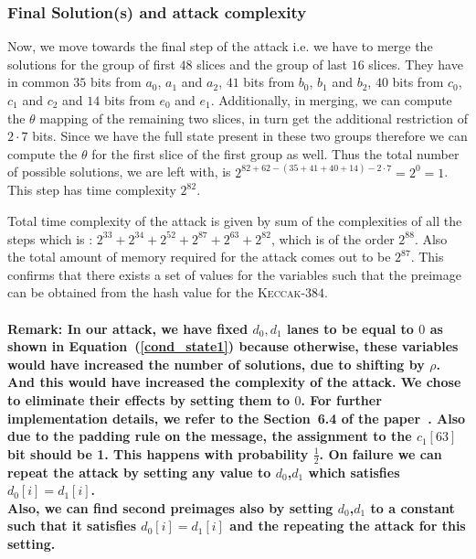 \documentclass[runningheads]{llncs}
\newcommand{\Keccak}{\mbox{\textsc{Keccak}}}
\begin{document}
\subsubsection{Final Solution(s) and attack complexity}
Now, we move towards the final step of the attack i.e. we have to merge the solutions for the group of first $48$ slices and the group of last $16$ slices. They have in common $35$ bits from $a_0$, $a_1$ and  $a_2$, $41$ bits from $b_0$, $b_1$ and $b_2$, $40$ bits from $c_0$, $c_1$ and $c_2$ and $14$ bits from $e_0$ and $e_1$. Additionally, in merging, we can compute the $\theta$ mapping of the remaining two slices, in turn get the additional restriction of $2\cdot 7$ bits. Since we have the full state present in these two groups therefore we can compute the $\theta$ for the first slice of the first group as well. Thus the total number of possible solutions, we are left with, is $2^{82 + 62 - (35 + 41 + 40 + 14) - 2 \cdot 7} = 2^{0} = 1$. This step has time complexity $ 2^{82}$.

Total time complexity of the attack is given by sum of the complexities of all the steps which is : $2^{33} + 2^{34} + 2^{52} + 2^{87} + 2^{63} + 2^{82}$, which is of the order $2^{88}$.
Also the total amount of memory required for the attack comes out to be $2^{87}$. 
This confirms that there exists a set of values for the variables such that the preimage can be obtained from the hash value for the \Keccak-$384$.


\paragraph{\textbf{Remark:}
In our attack, we have fixed $d_0, d_1$ lanes to be equal to $0$ as shown in Equation~(\ref{cond_state1}) because otherwise, these variables would have increased the number of solutions, due to shifting by $\rho$. 
And this would have increased the complexity of the attack. We chose to eliminate their effects by setting them to $0$. For further implementation details, we refer to the Section~6.4 of the paper~\cite{naya2011practical}. Also due to the padding rule on the message, the assignment to the $c_1[63]$ bit should be 1. This happens with probability $\tfrac{1}{2}$. On failure we can repeat the attack by setting any value to $d_0$,$d_1$ which satisfies $d_0[i]=d_1[i]$. \\
Also, we can find second preimages also by setting $d_0$,$d_1$ to a constant such that it satisfies $d_0[i]=d_1[i]$ and the repeating the attack for this setting.
}
\end{document}
